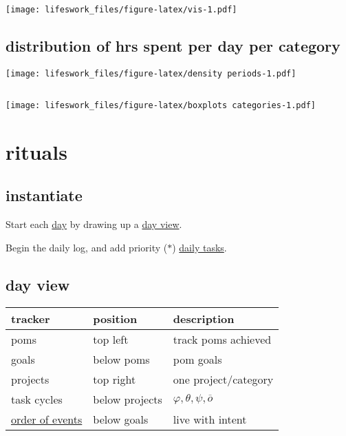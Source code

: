 \documentclass[]{book}
\begin{document}
\texttt{[image: lifeswork\_files/figure-latex/vis-1.pdf]}

\hypertarget{distribution-of-hrs-spent-per-day-per-category}{%
\section{distribution of hrs spent per day per category}\label{distribution-of-hrs-spent-per-day-per-category}}

\texttt{[image: lifeswork\_files/figure-latex/density periods-1.pdf]}

\hypertarget{section}{%
\section{}\label{section}}

\texttt{[image: lifeswork\_files/figure-latex/boxplots categories-1.pdf]}

\hypertarget{rituals}{%
\chapter{rituals}\label{rituals}}

\hypertarget{instantiate}{%
\section{instantiate}\label{instantiate}}

Start each \href{https://study.com/academy/lesson/german-days-of-the-week.html}{day} by drawing up a \protect\hyperlink{day-view}{day view}.

Begin the daily log, and add priority (\(*\)) \protect\hyperlink{daily-tasks}{daily tasks}.

\hypertarget{day-view}{%
\section{day view}\label{day-view}}

\begin{longtable}[]{@{}lll@{}}
\toprule
tracker & position & description\tabularnewline
\midrule
\endhead
poms & top left & track poms achieved\tabularnewline
goals & below poms & pom goals\tabularnewline
projects & top right & one project/category\tabularnewline
task cycles & below projects & \(\varphi, \theta, \psi, \overline o\)\tabularnewline
\protect\hyperlink{order-of-events}{order of events} & below goals & live with intent\tabularnewline
\bottomrule
\end{longtable}
\end{document}

